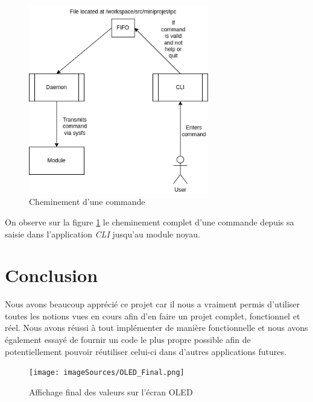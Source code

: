 \documentclass{ReportTemplate}
\begin{document}
\begin{figure}[H]
    \centering
    \includegraphics[width=0.7\textwidth]{imageSources/Cli_Command_Path.png}
    \caption{Cheminement d'une commande}
    \label{fig:CliCommandPAth}
\end{figure}
On observe sur la figure \ref{fig:CliCommandPAth} le cheminement complet d'une
commande depuis sa saisie dans l'application \textit{CLI} jusqu'au module noyau.
\chapter{Conclusion}
Nous avons beaucoup apprécié ce projet car il nous a vraiment permis d'utiliser
toutes les notions vues en cours afin d'en faire un projet complet, fonctionnel
et réel. Nous avons réussi à tout implémenter de manière fonctionnelle et nous
avons également essayé de fournir un code le plus propre possible afin de
potentiellement pouvoir réutiliser celui-ci dans d'autres applications futures.
\begin{figure}[H]
    \centering
    \texttt{[image: imageSources/OLED\_Final.png]}
    \caption{Affichage final des valeurs sur l'écran OLED}
    \label{fig:OLEDFInal}
\end{figure}
\end{document}
